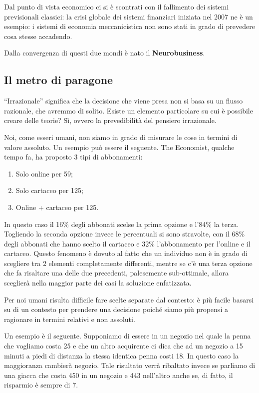 Dal punto di vista economico ci si è scontrati con il fallimento dei sistemi
previsionali classici: la crisi globale dei sistemi finanziari iniziata nel
2007 ne è un esempio: i sistemi di economia meccanicistica non sono stati in
grado di prevedere cosa stesse accadendo.

Dalla convergenza di questi due mondi è nato il \textbf{Neurobusiness}.

\subsection{Il metro di paragone}

``Irrazionale'' significa che la decisione che viene presa non si basa su un
flusso razionale, che avremmo di solito. Esiste un elemento particolare su cui
è possibile creare delle teorie? Sì, ovvero la prevedibilità del pensiero
irrazionale.

Noi, come esseri umani, non siamo in grado di misurare le cose in termini di
valore assoluto.
Un esempio può essere il seguente. The Economist, qualche tempo fa, ha 
proposto 3 tipi di abbonamenti:
\begin{enumerate}
 \item Solo online per 59\textdollar{};
 \item Solo cartaceo per 125\textdollar{};
 \item Online + cartaceo per 125\textdollar{}.
\end{enumerate}
In questo caso il 16\% degli abbonati scelse la prima opzione e l'84\% la terza.
Togliendo la seconda opzione invece le percentuali si sono stravolte, con il
68\% degli abbonati che hanno scelto il cartaceo e 32\% l'abbonamento per
l'online e il cartaceo. 
Questo fenomeno è dovuto al fatto che un individuo non è in grado di scegliere
tra 2 elementi completamente differenti, mentre se c'è una terza opzione che fa
risaltare una delle due precedenti, palesemente sub-ottimale, allora sceglierà
nella maggior parte dei casi la soluzione enfatizzata.

Per noi umani risulta difficile fare scelte separate dal contesto: è più
facile basarsi su di un contesto per prendere una decisione poiché siamo più 
propensi a ragionare in termini relativi e non assoluti.

\begin{example}
Un esempio è il seguente. Supponiamo di essere in un negozio nel quale
la penna che vogliamo costa 25\textdollar{} e che un altro acquirente ci dica
che ad un negozio a 15 minuti a piedi di distanza la stessa identica penna
costi 18\textdollar{}. In questo caso la maggioranza cambierà negozio. Tale
risultato verrà ribaltato invece se parliamo di una giacca che costa
450\textdollar{} in un negozio e 443\textdollar{} nell'altro anche se, di
fatto, il risparmio è sempre di 7\textdollar{}.
\end{example}

